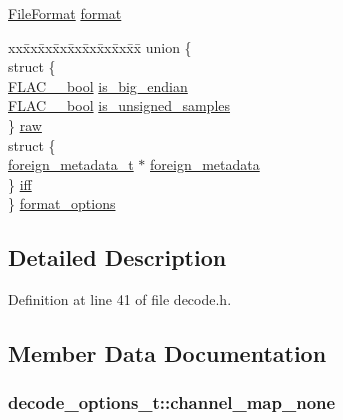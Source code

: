 \begin{DoxyCompactItemize}
\item 
\hyperlink{libflac_2src_2flac_2utils_8h_a610845e6f56e545283af144cbbb99cfe}{File\+Format} \hyperlink{structdecode__options__t_a07350a15d90fc7cdef3c2357578ebd88}{format}
\item 
\begin{tabbing}
xx\=xx\=xx\=xx\=xx\=xx\=xx\=xx\=xx\=\kill
union \{\\
\>struct \{\\
\>\>\hyperlink{ordinals_8h_a95103469f1cbd78b8cf250194985b34e}{FLAC\_\_bool} \hyperlink{structdecode__options__t_a7fc1291d097d6ccc9019b7ad43c47473}{is\_big\_endian}\\
\>\>\hyperlink{ordinals_8h_a95103469f1cbd78b8cf250194985b34e}{FLAC\_\_bool} \hyperlink{structdecode__options__t_a6adc8c1b3f95ae05c70d2dc5653daad3}{is\_unsigned\_samples}\\
\>\} \hyperlink{structdecode__options__t_a3d53f9eb1062db2b1ddf7cba27d4b259}{raw}\\
\>struct \{\\
\>\>\hyperlink{structforeign__metadata__t}{foreign\_metadata\_t} $\ast$ \hyperlink{structdecode__options__t_aef389aad459bdb64fe4dc2a3d232022d}{foreign\_metadata}\\
\>\} \hyperlink{structdecode__options__t_aafd974d7f74c6b9d784cae4be6fd6fd6}{iff}\\
\} \hyperlink{structdecode__options__t_a1f9c1189f564540e7e6d32b37f4c9e95}{format\_options}\\

\end{tabbing}\end{DoxyCompactItemize}


\subsection{Detailed Description}


Definition at line 41 of file decode.\+h.



\subsection{Member Data Documentation}
\subsubsection[{\texorpdfstring{channel\+\_\+map\+\_\+none}{channel_map_none}}]{ decode\+\_\+options\+\_\+t\+::channel\+\_\+map\+\_\+none}\hypertarget{structdecode__options__t_ada3f1ff7db4481f8ce2cbca8499b271d}{}\label{structdecode__options__t_ada3f1ff7db4481f8ce2cbca8499b271d}


